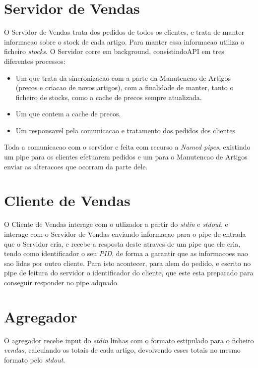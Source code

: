 \documentclass[a4paper]{report}
\begin{document}
\section{Servidor de Vendas}

O Servidor de Vendas trata dos pedidos de todos os clientes, e trata de 
manter informacao sobre o stock de cada artigo. Para manter essa informacao
utiliza o ficheiro \textit{stocks}. O Servidor corre em background, consistindoAPI
em tres diferentes processos:
\begin{itemize} 
    \item Um que trata da sincronizacao com a
        parte da Manutencao de Artigos (precos e criacao de novos artigos), com a
        finalidade de manter, tanto o ficheiro de stocks, como a cache de precos
        sempre atualizada.
    \item Um que contem a cache de precos.
    \item Um responsavel pela comunicacao e tratamento dos pedidos dos clientes
\end{itemize}
Toda a comunicacao com o servidor e feita com recurso a \textit{Named pipes},
existindo um pipe para os clientes efetuarem pedidos e um para o Manutencao
de Artigos enviar as alteracoes que ocorram da parte dele.

\section{Cliente de Vendas}

O Cliente de Vendas interage com o utlizador a partir do \textit{stdin} e 
\textit{stdout}, e interage com o Servidor de Vendas enviando informacao
para o pipe de entrada que o Servidor cria, e recebe a resposta deste
atraves de um pipe que ele cria, tendo como identificador o seu \textit{PID},
de forma a garantir que as informacoes nao sao lidas por outro cliente.
Para isto acontecer, para alem do pedido, e escrito no pipe de leitura do
servidor o identificador do cliente, que este esta preparado para conseguir
responder no pipe adquado.

\section{Agregador}

O agregador recebe input do \textit{stdin} linhas com o formato estipulado
para o ficheiro \textit{vendas}, calculando os totais de cada artigo,
devolvendo esses totais no mesmo formato pelo \textit{stdout}.
\end{document}
